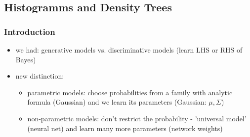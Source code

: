 \documentclass[11pt]{article}
\begin{document}
    \subsection{Histogramms and Density Trees}
      \subsubsection{Introduction}
        \begin{itemize}
          \item we had: generative models vs. discriminative models (learn LHS or RHS of Bayes)
          \item new distinction:
          \begin{itemize}
            \item parametric models: choose probabilities from a family with analytic formula (Gaussian)
            and we learn its parameters (Gaussian: $\mu,\Sigma$)
            \item non-parametric models: don't restrict the probability - 'universal model'
            (neural net) and learn many more parameters (network weights)
          \end{itemize}
        \end{itemize}
\end{document}

